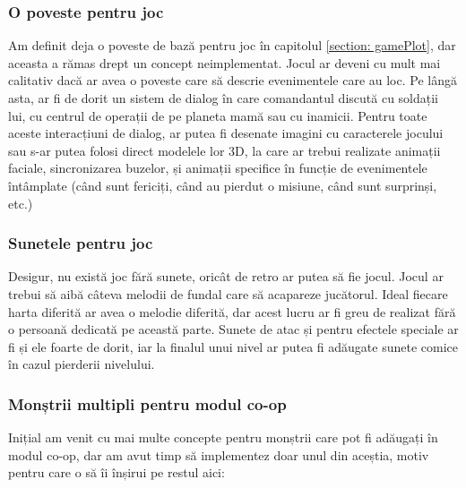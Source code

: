 \documentclass[12pt, a4paper]{article}
\begin{document}
	
	
	\subsubsection{O poveste pentru joc}
	
	Am definit deja o poveste de bază pentru joc în capitolul \ref{section: gamePlot}, dar aceasta a rămas drept un concept neimplementat. Jocul ar deveni cu mult mai calitativ dacă ar avea o poveste care să descrie evenimentele care au loc. Pe lângă asta, ar fi de dorit un sistem de dialog în care comandantul discută cu soldații lui, cu centrul de operații de pe planeta mamă sau cu inamicii. Pentru toate aceste interacțiuni de dialog, ar putea fi desenate imagini cu caracterele jocului sau s-ar putea folosi direct modelele lor 3D, la care ar trebui realizate animații faciale, sincronizarea buzelor, și animații specifice în funcție de evenimentele întâmplate (când sunt fericiți, când au pierdut o misiune, când sunt surprinși, etc.)
	
	
	
	
	\subsubsection{Sunetele pentru joc}
	
	Desigur, nu există joc fără sunete, oricât de retro ar putea să fie jocul. Jocul ar trebui să aibă câteva melodii de fundal care să acapareze jucătorul. Ideal fiecare harta diferită ar avea o melodie diferită, dar acest lucru ar fi greu de realizat fără o persoană dedicată pe această parte. Sunete de atac și pentru efectele speciale ar fi și ele foarte de dorit, iar la finalul unui nivel ar putea fi adăugate sunete comice în cazul pierderii nivelului.
	
	
	
	
	
	\subsubsection{Monștrii multipli pentru modul co-op}
	
	Inițial am venit cu mai multe concepte pentru monștrii care pot fi adăugați în modul co-op, dar am avut timp să implementez doar unul din aceștia, motiv pentru care o să îi înșirui pe restul aici:
	
\end{document}
